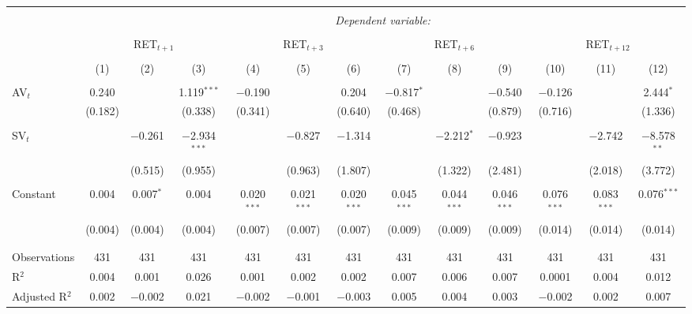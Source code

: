 
\begin{table}[!htbp] \centering 
  \caption{} 
  \label{} 
\begin{tabular}{@{\extracolsep{5pt}}lcccccccccccc} 
\\[-1.8ex]\hline 
\hline \\[-1.8ex] 
 & \multicolumn{12}{c}{\textit{Dependent variable:}} \\ 
\cline{2-13} 
\\[-1.8ex] & \multicolumn{3}{c}{RET$_{t+1}$} & \multicolumn{3}{c}{RET$_{t+3}$} & \multicolumn{3}{c}{RET$_{t+6}$} & \multicolumn{3}{c}{RET$_{t+12}$} \\ 
\\[-1.8ex] & (1) & (2) & (3) & (4) & (5) & (6) & (7) & (8) & (9) & (10) & (11) & (12)\\ 
\hline \\[-1.8ex] 
 AV$_{t}$ & 0.240 &  & 1.119$^{***}$ & $-$0.190 &  & 0.204 & $-$0.817$^{*}$ &  & $-$0.540 & $-$0.126 &  & 2.444$^{*}$ \\ 
  & (0.182) &  & (0.338) & (0.341) &  & (0.640) & (0.468) &  & (0.879) & (0.716) &  & (1.336) \\ 
  & & & & & & & & & & & & \\ 
 SV$_{t}$ &  & $-$0.261 & $-$2.934$^{***}$ &  & $-$0.827 & $-$1.314 &  & $-$2.212$^{*}$ & $-$0.923 &  & $-$2.742 & $-$8.578$^{**}$ \\ 
  &  & (0.515) & (0.955) &  & (0.963) & (1.807) &  & (1.322) & (2.481) &  & (2.018) & (3.772) \\ 
  & & & & & & & & & & & & \\ 
 Constant & 0.004 & 0.007$^{*}$ & 0.004 & 0.020$^{***}$ & 0.021$^{***}$ & 0.020$^{***}$ & 0.045$^{***}$ & 0.044$^{***}$ & 0.046$^{***}$ & 0.076$^{***}$ & 0.083$^{***}$ & 0.076$^{***}$ \\ 
  & (0.004) & (0.004) & (0.004) & (0.007) & (0.007) & (0.007) & (0.009) & (0.009) & (0.009) & (0.014) & (0.014) & (0.014) \\ 
  & & & & & & & & & & & & \\ 
\hline \\[-1.8ex] 
Observations & 431 & 431 & 431 & 431 & 431 & 431 & 431 & 431 & 431 & 431 & 431 & 431 \\ 
R$^{2}$ & 0.004 & 0.001 & 0.026 & 0.001 & 0.002 & 0.002 & 0.007 & 0.006 & 0.007 & 0.0001 & 0.004 & 0.012 \\ 
Adjusted R$^{2}$ & 0.002 & $-$0.002 & 0.021 & $-$0.002 & $-$0.001 & $-$0.003 & 0.005 & 0.004 & 0.003 & $-$0.002 & 0.002 & 0.007 \\ 

\end{tabular}
\end{table}
